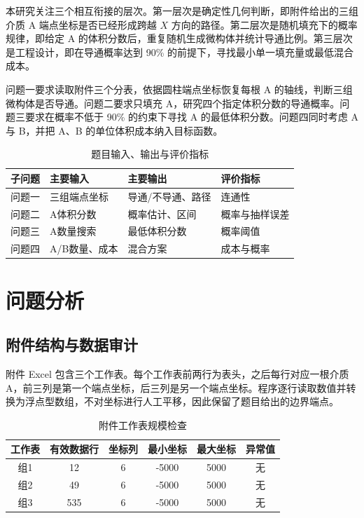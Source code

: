 \documentclass[12pt,a4paper,fontset=windows]{ctexart}
\begin{document}
本研究关注三个相互衔接的层次。第一层次是确定性几何判断，即附件给出的三组介质 A 端点坐标是否已经形成跨越 $X$ 方向的路径。第二层次是随机填充下的概率规律，即给定 A 的体积分数后，重复随机生成微构体并统计导通比例。第三层次是工程设计，即在导通概率达到 90\% 的前提下，寻找最小单一填充量或最低混合成本。

问题一要求读取附件三个分表，依据圆柱端点坐标恢复每根 A 的轴线，判断三组微构体是否导通。问题二要求只填充 A，研究四个指定体积分数的导通概率。问题三要求在概率不低于 90\% 的约束下寻找 A 的最低体积分数。问题四同时考虑 A 与 B，并把 A、B 的单位体积成本纳入目标函数。

\begin{table}[H]\centering\caption{题目输入、输出与评价指标}\begin{tabular}{p{2.5cm}p{4.2cm}p{4.2cm}p{3cm}}\toprule 子问题&主要输入&主要输出&评价指标\\\midrule 问题一&三组端点坐标&导通/不导通、路径&连通性\\问题二&A体积分数&概率估计、区间&概率与抽样误差\\问题三&A数量搜索&最低体积分数&概率阈值\\问题四&A/B数量、成本&混合方案&成本与概率\\\bottomrule\end{tabular}\end{table}

\section{问题分析}

\subsection{附件结构与数据审计}
附件 Excel 包含三个工作表。每个工作表前两行为表头，之后每行对应一根介质 A，前三列是第一个端点坐标，后三列是另一个端点坐标。程序逐行读取数值并转换为浮点型数组，不对坐标进行人工平移，因此保留了题目给出的边界端点。

\begin{table}[H]\centering\caption{附件工作表规模检查}\begin{tabular}{cccccc}\toprule 工作表&有效数据行&坐标列&最小坐标&最大坐标&异常值\\\midrule 组1&12&6&-5000&5000&无\\组2&49&6&-5000&5000&无\\组3&535&6&-5000&5000&无\\\bottomrule\end{tabular}\end{table}
\end{document}
